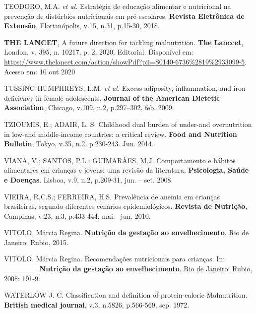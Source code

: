 \bigbreak

\noindent TEODORO, M.A. \textit{et al.} Estratégia de educação alimentar e nutricional na prevenção de distúrbios nutricionais em pré-escolares. \textbf{Revista Eletrônica de Extensão}, Florianópolis, v.15, n.31, p.15-30, 2018.

\bigbreak

\noindent \textbf{THE LANCET}, A future direction for tackling malnutrition. \textbf{The Lanccet}, London, v. 395, n. 10217, p. 2, 2020. Editorial. Disponível em: \url{https://www.thelancet.com/action/showPdf?pii=S0140-6736\%2819\%2933099-5}. Acesso em: 10 out 2020

\bigbreak

\noindent TUSSING-HUMPHREYS, L.M. \textit{et al.} Excess adiposity, inflammation, and iron deficiency in female adolescents. \textbf{Journal of the American Dietetic Association}, Chicago, v.109, n.2, p.297–302, feb. 2009. 

\bigbreak

\noindent TZIOUMIS, E.; ADAIR, L. S. Childhood dual burden of under-and overnutrition in low-and middle-income countries: a critical review. \textbf{Food and Nutrition Bulletin}, Tokyo, v.35, n.2, p.230-243. Jun. 2014.

\bigbreak

\noindent VIANA, V.; SANTOS, P.L.; GUIMARÃES, M.J. Comportamento e hábitos alimentares em crianças e jovens: uma revisão da literatura. \textbf{Psicologia, Saúde e Doenças}. Lisboa, v.9, n.2, p.209-31, jun. – set. 2008.

\bigbreak

\noindent VIEIRA, R.C.S.; FERREIRA, H.S. Prevalência de anemia em crianças brasileiras, segundo diferentes cenários epidemiológicos. \textbf{Revista de Nutrição}, Campinas, v.23, n.3, p.433-444, mai. –jun. 2010.

\bigbreak

\noindent VITOLO, Márcia Regina. \textbf{Nutrição da gestação ao envelhecimento}. Rio de Janeiro: Rubio, 2015.

\bigbreak

\noindent VITOLO, Márcia Regina. Recomendações nutricionais para crianças. In: \_\_\_\_\_\_. \textbf{Nutrição da gestação ao envelhecimento}. Rio de Janeiro: Rubio, 2008: 191-9.

\bigbreak

\noindent WATERLOW J. C. Classification and definition of protein-calorie Malnutrition. \textbf{British medical journal}, v.3, n.5826, p.566-569, sep. 1972.

